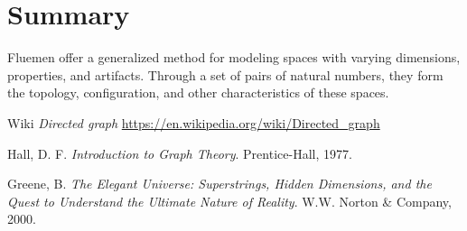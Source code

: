 \documentclass[final]{article}
\begin{document}
    \section{Summary}

        Fluemen offer a generalized method for modeling spaces with varying 
        dimensions, properties, and artifacts. Through a set of pairs of 
        natural numbers, they form the topology, configuration, and other 
        characteristics of these spaces.

    \begin{thebibliography}{9}

         Wiki
        \textit{Directed graph}
        \url{https://en.wikipedia.org/wiki/Directed_graph}

         Hall, D. F. \textit{Introduction to Graph Theory}.
        Prentice-Hall, 1977.

         Greene, B. \textit{The Elegant Universe:
        Superstrings, Hidden Dimensions, and the Quest to Understand the
        Ultimate Nature of Reality}. W.W. Norton \& Company, 2000.

    \end{thebibliography}
\end{document}
